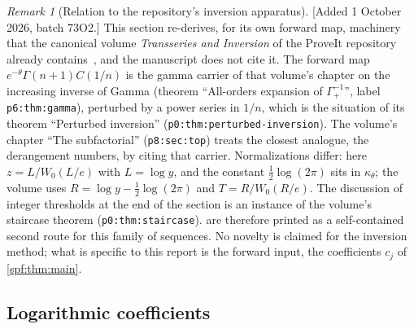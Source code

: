\documentclass[11pt]{article}
\numberwithin{equation}{section}
\theoremstyle{definition}
\theoremstyle{remark}
\newtheorem{remark}[theorem]{Remark}
\theoremstyle{definition}
\begin{document}
\begin{remark}[Relation to the repository's inversion apparatus]
\label{spf:rem:inverse-apparatus}
[Added 1 October 2026, batch 73O2.] This section re-derives, for its own
forward map, machinery that the canonical volume \emph{Transseries and
Inversion} of the ProveIt repository already contains~\cite{tai}, and the
manuscript does not cite it. The forward map
$e^{-\theta}\Gamma(n+1)C(1/n)$ is the gamma carrier of that volume's chapter
on the increasing inverse of Gamma (theorem ``All-orders expansion of
$\Gamma_+^{-1}$'', label \texttt{p6:thm:gamma}), perturbed by a power series
in $1/n$, which is the situation of its theorem ``Perturbed inversion''
(\texttt{p0:thm:perturbed-inversion}). The volume's chapter ``The
subfactorial'' (\texttt{p8:sec:top}) treats the closest analogue, the
derangement numbers, by citing that carrier. Normalizations differ: here
$z=L/W_0(L/e)$ with $L=\log y$, and the constant $\tfrac12\log(2\pi)$ sits in
$\kappa_\theta$; the volume uses $R=\log y-\tfrac12\log(2\pi)$ and
$T=R/W_0(R/e)$. The discussion of integer thresholds at the end of the
section is an instance of the volume's staircase theorem
(\texttt{p0:thm:staircase}). 
are therefore printed as a self-contained second route for this family of
sequences. No novelty is claimed for the inversion method; what is specific
to this report is the forward input, the coefficients $c_j$ of
\cref{spf:thm:main}.
\end{remark}

\subsection{Logarithmic coefficients}
\end{document}
